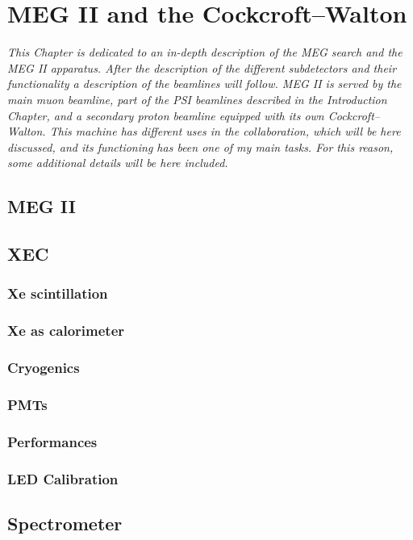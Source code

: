 \chapter{MEG II and the Cockcroft–Walton}
\begin{refsection}
{\itshape This Chapter is dedicated to an in-depth description of the MEG search and the MEG II apparatus. After the description of the different subdetectors and their functionality a description of the beamlines will follow. MEG II is served by the main muon beamline, part of the PSI beamlines described in the Introduction Chapter, and a secondary proton beamline equipped with its own Cockcroft–Walton. This machine has different uses in the collaboration, which will be here discussed, and its functioning has been one of my main tasks. For this reason, some additional details will be here included.}

\section{MEG II}
\section{XEC}
    \subsection{Xe scintillation}
    \subsection{Xe as calorimeter}
    \subsection{Cryogenics}
    \subsection{PMTs}
    \subsection{Performances}
    \subsection{LED Calibration}
    \label{LED}

\section{Spectrometer}

\end{refsection}
